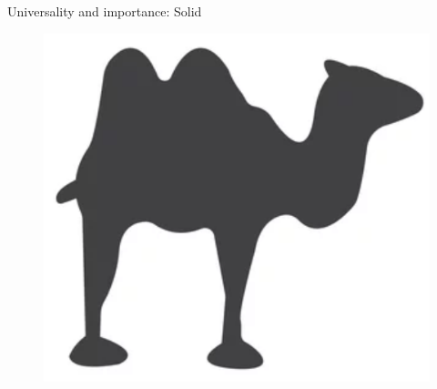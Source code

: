 \documentclass[usenames,dvipsnames]{beamer}
\begin{document}
\begin{frame}{\huge{Universality and importance: Solid}}
\begin{itemize}
\begin{figure}
           \includegraphics[scale=0.3]{Images/camel_foot_2.png}
       \end{figure}
       \end{itemize}
       
       
       
      
       
       
\end{frame}
\end{document}
